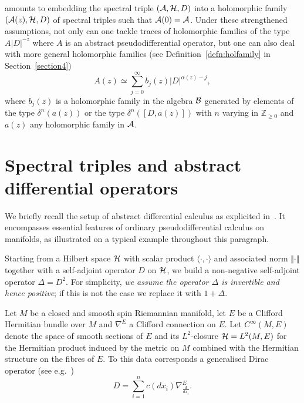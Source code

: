 \documentclass[11pt]{article}
\def \Z {\mathbb Z}
\def \Ci {{C^\infty}}
\numberwithin{equation}{section}
\begin{document}
amounts to embedding the spectral triple $\left({\cal A}, {\cal
    H}, D\right)$ into a holomorphic family $\left({\cal A}(z), {\cal
    H}, D\right)$ of spectral triples such that ${\cal A}(0)={\cal A}$.  Under these strengthened  assumptions,   not only can one  tackle
traces of holomorphic families of the type  $A
\vert D\vert^{-z}$ where $A$ is an abstract pseudodif\/ferential operator, but
one can also deal with
more general holomorphic families (see Def\/inition~\ref{defn:holfamily} in
Section~\ref{section4})
\[
A(z)\simeq\sum_{j=0}^\infty
b_j(z) \vert D\vert^{\alpha(z)-j},
\]
 where $b_j(z)$ is a holomorphic family in
the algebra ${\cal B}$  generated by  elements  of the type $\delta^n(a(z))$ or the type $ \delta^n\left([D,
  a(z)]\right)$ with $  n$ varying in $ \Z_{\geq 0}$ and  $a(z)$ any holomorphic family in ${\cal
  A} $.
\setcounter{section}{1}
\setcounter{subsection}{0}
\setcounter{subsubsection}{0}
\setcounter{equation}{0}
\setcounter{footnote}{3}
\section{Spectral triples and abstract dif\/ferential operators}\label{section2}

We brief\/ly recall the setup of abstract dif\/ferential calculus as
explicited in~\cite{Hig}. It encompasses essential features of ordinary
pseudodif\/ferential calculus on manifolds, as  illustrated on a typical
example throughout this paragraph.

 Starting from a Hilbert space $ {\cal H}$ with scalar product $\langle\cdot, \cdot\rangle$ and associated norm $\Vert \cdot\Vert$ together with   a
self-adjoint operator $D$ on ${\cal H}$, we build a
non-negative self-adjoint operator $\Delta= D^2$.  For simplicity,  {\it we assume
the operator $\Delta$ is
invertible and hence positive}; if this is not the case we replace it  with
$1+\Delta$.
\begin{example}\label{ex:spin} Let $M$ be a closed and  smooth spin Riemannian  manifold, let  $E$
 be  a Clif\/ford Hermitian bundle
  over $M$ and $\nabla^E$ a Clif\/ford connection on $E$. Let $\Ci(M,E)$ denote
  the space of smooth sections of $E$ and  its $L^2$-closure ${\cal H}=L^2(M, E)$ for
  the Hermitian product induced by the metric on $M$ combined with the Hermitian
  structure on the f\/ibres of $E$. To this data corresponds a generalised Dirac
  operator (see e.g.~\cite{BGV})
  \[
  D= \sum_{i=1}^n c(dx_i)
  \nabla_{\frac{d}{dx_i}}^E.
  \]
\end{example}
\end{document}
